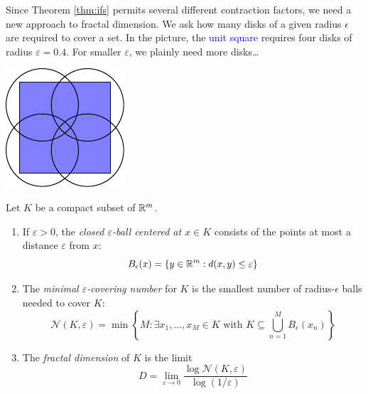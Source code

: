 \begin{minipage}[t]{0.8\linewidth}\vspace{0pt}
	
	Since Theorem \ref{thm:ifs} permits several different contraction factors, we need a new approach to fractal dimension. We ask how many disks of a given radius $\epsilon$ are required to cover a set. In the picture, the \textcolor{blue}{unit square} requires four disks of radius $\varepsilon=0.4$. For smaller $\varepsilon$, we plainly need more disks\ldots
\end{minipage}
\hfill
\begin{minipage}[t]{0.19\linewidth}\vspace{0pt}
	\flushright\includegraphics{epsiloncover}
\end{minipage}


\begin{defn}{}{}
	Let $K$ be a compact subset of $\mathbb{R}^m$.
	\begin{enumerate}
	  \item If $\varepsilon>0$, the \emph{closed $\varepsilon$-ball centered at $x\in K$} consists of the points at most a distance $\varepsilon$ from $x$:
		\[
			B_\epsilon(x)=\{y\in\mathbb{R}^m:d(x,y)\le\varepsilon\}
		\]
		\item The \emph{minimal $\varepsilon$-covering number} for $K$ is the smallest number of radius-$\epsilon$ balls needed to cover $K$:
		\[
			\mathcal N(K,\varepsilon)=\min\left\{M:\exists x_1,\ldots,x_M\in K\text{ with }K\subseteq \bigcup\limits_{n=1}^MB_\epsilon(x_n)\right\}
		\]
		
		\item The \emph{fractal dimension} of $K$ is the limit
		\[
			D=\lim_{\varepsilon\to 0}\frac{\log\mathcal N(K,\varepsilon)}{\log (1/\varepsilon)}
		\]
	\end{enumerate}
\end{defn}

